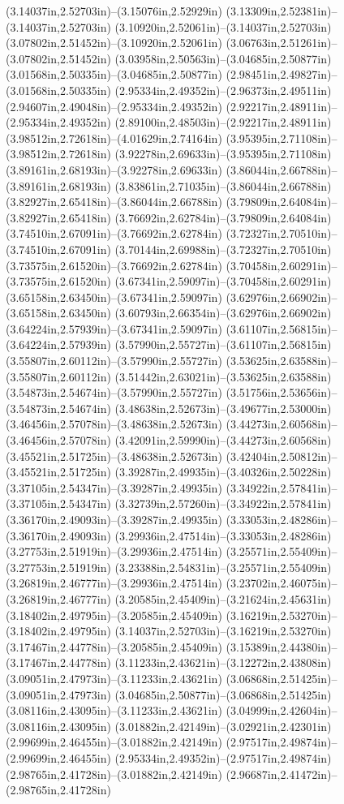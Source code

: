 (3.14037in,2.52703in)--(3.15076in,2.52929in) (3.13309in,2.52381in)--(3.14037in,2.52703in) (3.10920in,2.52061in)--(3.14037in,2.52703in) (3.07802in,2.51452in)--(3.10920in,2.52061in) (3.06763in,2.51261in)--(3.07802in,2.51452in) (3.03958in,2.50563in)--(3.04685in,2.50877in) (3.01568in,2.50335in)--(3.04685in,2.50877in) (2.98451in,2.49827in)--(3.01568in,2.50335in) (2.95334in,2.49352in)--(2.96373in,2.49511in) (2.94607in,2.49048in)--(2.95334in,2.49352in) (2.92217in,2.48911in)--(2.95334in,2.49352in) (2.89100in,2.48503in)--(2.92217in,2.48911in) (3.98512in,2.72618in)--(4.01629in,2.74164in) (3.95395in,2.71108in)--(3.98512in,2.72618in) (3.92278in,2.69633in)--(3.95395in,2.71108in) (3.89161in,2.68193in)--(3.92278in,2.69633in) (3.86044in,2.66788in)--(3.89161in,2.68193in) (3.83861in,2.71035in)--(3.86044in,2.66788in) (3.82927in,2.65418in)--(3.86044in,2.66788in) (3.79809in,2.64084in)--(3.82927in,2.65418in) (3.76692in,2.62784in)--(3.79809in,2.64084in) (3.74510in,2.67091in)--(3.76692in,2.62784in) (3.72327in,2.70510in)--(3.74510in,2.67091in) (3.70144in,2.69988in)--(3.72327in,2.70510in) (3.73575in,2.61520in)--(3.76692in,2.62784in) (3.70458in,2.60291in)--(3.73575in,2.61520in) (3.67341in,2.59097in)--(3.70458in,2.60291in) (3.65158in,2.63450in)--(3.67341in,2.59097in) (3.62976in,2.66902in)--(3.65158in,2.63450in) (3.60793in,2.66354in)--(3.62976in,2.66902in) (3.64224in,2.57939in)--(3.67341in,2.59097in) (3.61107in,2.56815in)--(3.64224in,2.57939in) (3.57990in,2.55727in)--(3.61107in,2.56815in) (3.55807in,2.60112in)--(3.57990in,2.55727in) (3.53625in,2.63588in)--(3.55807in,2.60112in) (3.51442in,2.63021in)--(3.53625in,2.63588in) (3.54873in,2.54674in)--(3.57990in,2.55727in) (3.51756in,2.53656in)--(3.54873in,2.54674in) (3.48638in,2.52673in)--(3.49677in,2.53000in) (3.46456in,2.57078in)--(3.48638in,2.52673in) (3.44273in,2.60568in)--(3.46456in,2.57078in) (3.42091in,2.59990in)--(3.44273in,2.60568in) (3.45521in,2.51725in)--(3.48638in,2.52673in) (3.42404in,2.50812in)--(3.45521in,2.51725in) (3.39287in,2.49935in)--(3.40326in,2.50228in) (3.37105in,2.54347in)--(3.39287in,2.49935in) (3.34922in,2.57841in)--(3.37105in,2.54347in) (3.32739in,2.57260in)--(3.34922in,2.57841in) (3.36170in,2.49093in)--(3.39287in,2.49935in) (3.33053in,2.48286in)--(3.36170in,2.49093in) (3.29936in,2.47514in)--(3.33053in,2.48286in) (3.27753in,2.51919in)--(3.29936in,2.47514in) (3.25571in,2.55409in)--(3.27753in,2.51919in) (3.23388in,2.54831in)--(3.25571in,2.55409in) (3.26819in,2.46777in)--(3.29936in,2.47514in) (3.23702in,2.46075in)--(3.26819in,2.46777in) (3.20585in,2.45409in)--(3.21624in,2.45631in) (3.18402in,2.49795in)--(3.20585in,2.45409in) (3.16219in,2.53270in)--(3.18402in,2.49795in) (3.14037in,2.52703in)--(3.16219in,2.53270in) (3.17467in,2.44778in)--(3.20585in,2.45409in) (3.15389in,2.44380in)--(3.17467in,2.44778in) (3.11233in,2.43621in)--(3.12272in,2.43808in) (3.09051in,2.47973in)--(3.11233in,2.43621in) (3.06868in,2.51425in)--(3.09051in,2.47973in) (3.04685in,2.50877in)--(3.06868in,2.51425in) (3.08116in,2.43095in)--(3.11233in,2.43621in) (3.04999in,2.42604in)--(3.08116in,2.43095in) (3.01882in,2.42149in)--(3.02921in,2.42301in) (2.99699in,2.46455in)--(3.01882in,2.42149in) (2.97517in,2.49874in)--(2.99699in,2.46455in) (2.95334in,2.49352in)--(2.97517in,2.49874in) (2.98765in,2.41728in)--(3.01882in,2.42149in) (2.96687in,2.41472in)--(2.98765in,2.41728in) 